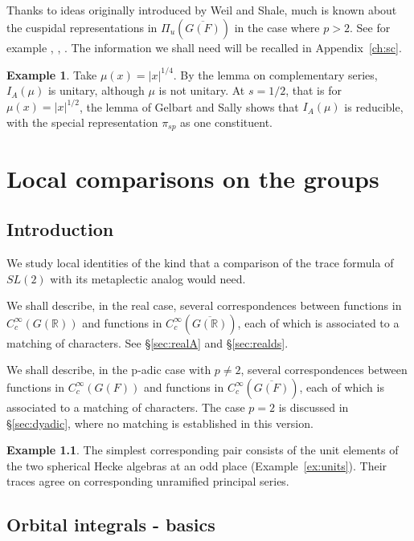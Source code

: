 \documentclass[12pt,letterpaper,openany]{book}
\theoremstyle{plain}
\theoremstyle{definition}
\newtheorem{example}[theorem]{Example}
\theoremstyle{remark}
\theoremstyle{remark}
\begin{document}
Thanks to ideas originally introduced by Weil and Shale, much is known about
the cuspidal representations in $\Pi _u(\overline{G(F)})$ in the case
where $p>2$. See for example \cite{M1}, \cite{M2}, \cite{M3}.
The information we shall need will be recalled in Appendix~\ref{ch:sc}.



\begin{example}
Take $\mu(x)=|x|^{1/4}$. By the lemma on complementary series, $I_A(\mu)$ is
unitary, although $\mu$ is not unitary. At $s=1/2$, that is for
$\mu(x)=|x|^{1/2}$, the lemma of Gelbart and Sally shows that $I_A(\mu)$ is
reducible, with the special representation $\pi_{sp}$ as one constituent.
\end{example}

\chapter{Local comparisons on the groups}\label{ch:local}

\section{Introduction}
We study local identities of the kind that a comparison of the
trace formula of $SL(2)$ with its metaplectic analog would need.

We shall describe, in the real case, several
correspondences between functions in
$C_c^\infty(G({\mathbb{R}}))$ and functions in
$C_c^\infty(\overline{G({\mathbb{R}})})$, each of which is associated
to a matching of characters. See \S\ref{sec:realA} and
\S\ref{sec:realds}.

We shall describe, in the p-adic case with $p\not= 2$,
several correspondences between functions in
$C_c^\infty(G(F))$ and functions in
$C_c^\infty(\overline{G(F)})$, each of which is associated
to a matching of characters. The case $p=2$ is discussed in
\S\ref{sec:dyadic}, where no matching is established in this version.

\begin{example}
The simplest corresponding pair consists of the unit elements of the two
spherical Hecke algebras at an odd place (Example~\ref{ex:units}). Their
traces agree on corresponding unramified principal series.
\end{example}

\section{Orbital integrals - basics}
\end{document}
